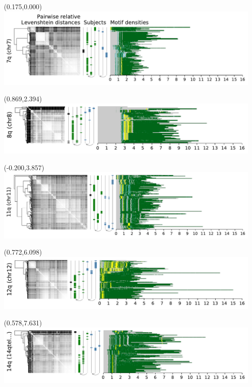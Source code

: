\documentclass{article}
\begin{document}
\begin{textblock}{13}(0.175,0.000)\includegraphics{Figure_5/chr7.pdf}\end{textblock}
\begin{textblock}{13}(0.869,2.394)\includegraphics{Figure_5/chr8.pdf}\end{textblock}
\begin{textblock}{13}(-0.200,3.857)\includegraphics{Figure_5/chr11.pdf}\end{textblock}
\begin{textblock}{13}(0.772,6.098)\includegraphics{Figure_5/chr12.pdf}\end{textblock}
\begin{textblock}{13}(0.578,7.631)\includegraphics{Figure_5/14qtel_1-500K_1_12_12_rc.pdf}\end{textblock}
\end{document}
